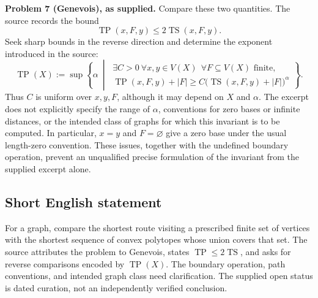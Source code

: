 \documentclass[11pt]{article}
\begin{document}
\textbf{Problem 7 (Genevois), as supplied.} Compare these two quantities. The source records the bound
\[
\operatorname{TP}(x,F,y)\leq 2\operatorname{TS}(x,F,y).
\]
Seek sharp bounds in the reverse direction and determine the exponent introduced in the source:
\[
\operatorname{TP}(X):=
\sup\left\{\alpha\ \middle|\
\begin{array}{l}
\exists C>0\ \forall x,y\in V(X)\ \
\forall F\subseteq V(X)\text{ finite},\\[2pt]
\operatorname{TP}(x,F,y)+|F|
\geq C\bigl(\operatorname{TS}(x,F,y)+|F|\bigr)^{\alpha}
\end{array}\right\}.
\]
Thus \(C\) is uniform over \(x,y,F\), although it may depend on \(X\) and \(\alpha\). The excerpt does not explicitly specify the range of \(\alpha\), conventions for zero bases or infinite distances, or the intended class of graphs for which this invariant is to be computed. In particular, \(x=y\) and \(F=\varnothing\) give a zero base under the usual length-zero convention. These issues, together with the undefined boundary operation, prevent an unqualified precise formulation of the invariant from the supplied excerpt alone.
\subsection{Short English statement}
For a graph, compare the shortest route visiting a prescribed finite set of vertices with the shortest sequence of convex polytopes whose union covers that set. The source attributes the problem to Genevois, states \(\operatorname{TP}\leq2\operatorname{TS}\), and asks for reverse comparisons encoded by \(\operatorname{TP}(X)\). The boundary operation, path conventions, and intended graph class need clarification. The supplied open status is dated curation, not an independently verified conclusion.
\end{document}
